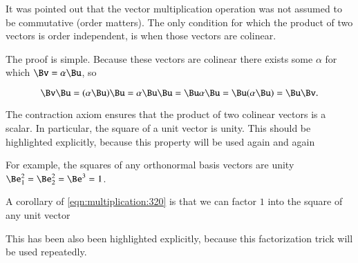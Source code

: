 %
%
It was pointed out that the vector multiplication operation was not assumed to be commutative (order matters).
The only condition for which the product of two vectors is order independent, is when those vectors are colinear.


The proof is simple.
Because these vectors are colinear there exists some \( \alpha \) for which \( \Bv = \alpha \Bu \), so

\begin{dmath}\label{eqn:multivector:380}
\Bv \Bu
=
(\alpha \Bu) \Bu
=
\alpha \Bu \Bu
=
\Bu \alpha \Bu
=
\Bu (\alpha \Bu)
=
\Bu \Bv.
\end{dmath}

The contraction axiom ensures that the product of two colinear vectors is a scalar.
In particular, the square of a unit vector is unity.
This should be highlighted explicitly, because this property will be used again and again

For example, the squares of any orthonormal basis vectors are unity \( \Be_1^2 = \Be_2^2 = \Be^3 = 1 \).

A corollary of
\cref{eqn:multiplication:320} is that we can factor \( 1 \) into
the square of any unit vector


This has been also been highlighted explicitly, because this factorization trick will be used repeatedly.
